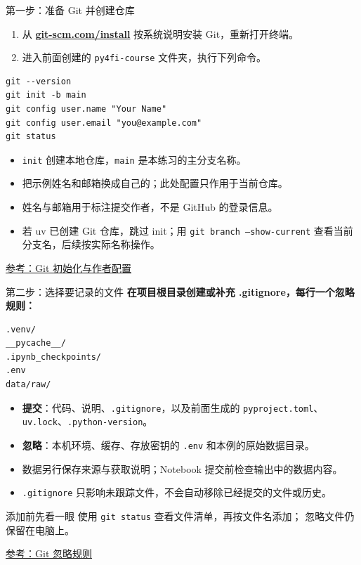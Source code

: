 \documentclass[9pt]{ctexbeamer}
\begin{document}
\begin{frame}[fragile]{第一步：准备 Git 并创建仓库}
  \begin{enumerate}
    \item 从 \href{https://git-scm.com/install/}{\textbf{git-scm.com/install}} 按系统说明安装 Git，重新打开终端。
    \item 进入前面创建的 \texttt{py4fi-course} 文件夹，执行下列命令。
  \end{enumerate}
\begin{lstlisting}[language={},numbers=none]
git --version
git init -b main
git config user.name "Your Name"
git config user.email "you@example.com"
git status
\end{lstlisting}
  \begin{itemize}
    \item \texttt{init} 创建本地仓库，\texttt{main} 是本练习的主分支名称。
    \item 把示例姓名和邮箱换成自己的；此处配置只作用于当前仓库。
    \item 姓名与邮箱用于标注提交作者，不是 GitHub 的登录信息。
    \item 若 uv 已创建 Git 仓库，跳过 init；用 \texttt{git branch --show-current} 查看当前分支名，后续按实际名称操作。
  \end{itemize}
  {\tiny\href{https://git-scm.com/docs/gittutorial}{参考：Git 初始化与作者配置}}
\end{frame}

\begin{frame}[fragile]{第二步：选择要记录的文件}
  \textbf{在项目根目录创建或补充 .gitignore，每行一个忽略规则：}
\begin{lstlisting}[language={},numbers=none]
.venv/
__pycache__/
.ipynb_checkpoints/
.env
data/raw/
\end{lstlisting}
  \begin{itemize}
    \item \textbf{提交}：代码、说明、\texttt{.gitignore}，以及前面生成的
      \texttt{pyproject.toml}、\texttt{uv.lock}、\texttt{.python-version}。
    \item \textbf{忽略}：本机环境、缓存、存放密钥的 \texttt{.env} 和本例的原始数据目录。
    \item 数据另行保存来源与获取说明；Notebook 提交前检查输出中的数据内容。
    \item \texttt{.gitignore} 只影响未跟踪文件，不会自动移除已经提交的文件或历史。
  \end{itemize}
  \begin{block}{添加前先看一眼}
    使用 \texttt{git status} 查看文件清单，再按文件名添加；
    忽略文件仍保留在电脑上。
  \end{block}
  {\tiny\href{https://git-scm.com/docs/gitignore}{参考：Git 忽略规则}}
\end{frame}
\end{document}
